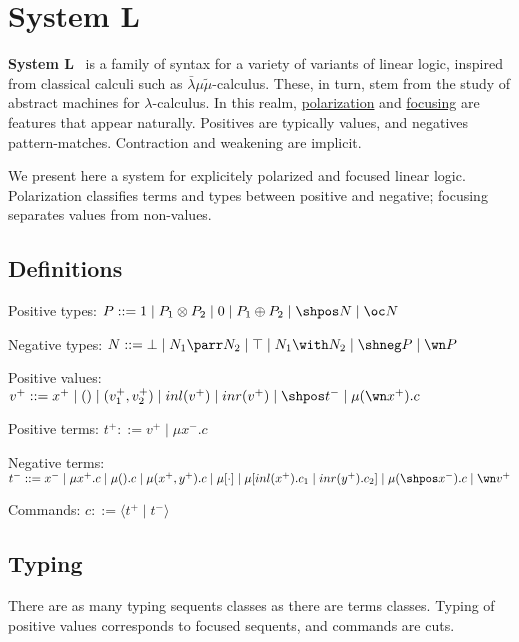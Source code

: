 \chapter{System L}\label{system-l}

\textbf{System L}~\cite{dualitycomputationfocus} is a family of syntax for a variety of variants of
linear logic, inspired from classical calculi such as
\(\bar\lambda\mu\tilde\mu\)-calculus. These, in turn, stem from the
study of abstract machines for \(\lambda\)-calculus. In this realm,
\hyperref[polarized-linear-logic]{polarization} and \hyperref[reversibility-and-focusing]{focusing} are
features that appear naturally. Positives are typically values, and
negatives pattern-matches. Contraction and weakening are implicit.

We present here a system for explicitely polarized and focused linear
logic. Polarization classifies terms and types between positive and
negative; focusing separates values from non-values.

\section{Definitions}\label{definitions}

Positive types:
\(P ::= 1 \mid P_1 \otimes P_2 \mid 0 \mid P_1 \oplus P_2 \mid \shpos N \mid \oc N\)

Negative types:
\(N ::= \bot \mid N_1 \parr N_2 \mid \top \mid N_1 \with N_2 \mid \shneg P \mid \wn P\)

Positive values:
\(v^+ ::= x^+ \mid () \mid (v_1^+, v_2^+) \mid inl(v^+) \mid inr(v^+) \mid \shpos t^- \mid \mu(\wn x^+).c\)

Positive terms: \(t^+ ::= v^+ \mid \mu x^-.c\)

Negative terms:
\(t^- ::= x^- \mid \mu x^+.c \mid \mu().c \mid \mu(x^+, y^+).c \mid \mu [\cdot] \mid \mu[inl(x^+).c_1 \mid inr(y^+).c_2] \mid \mu(\shpos x^-).c \mid \wn v^+\)

Commands: \(c ::= \langle t^+ \mid t^- \rangle\)

\section{Typing}\label{typing}

There are as many typing sequents classes as there are terms classes.
Typing of positive values corresponds to focused sequents, and
commands are cuts.

